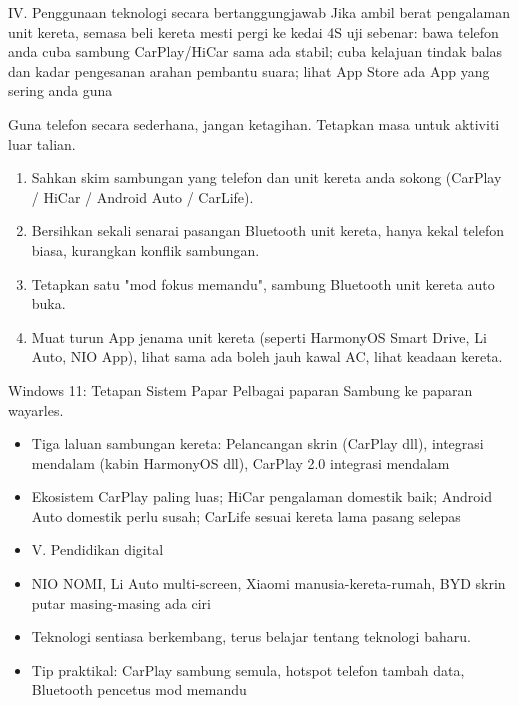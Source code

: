 \begin{tcbinfo}{IV. Penggunaan teknologi secara bertanggungjawab}
Jika ambil berat pengalaman unit kereta, semasa beli kereta mesti pergi ke kedai 4S uji sebenar: bawa telefon anda cuba sambung CarPlay/HiCar sama ada stabil; cuba kelajuan tindak balas dan kadar pengesanan arahan pembantu suara; lihat App Store ada App yang sering anda guna

\end{tcbinfo}

\begin{tcbpractice}{Guna telefon secara sederhana, jangan ketagihan. Tetapkan masa untuk aktiviti luar talian.}
\begin{enumerate}
  \item Sahkan skim sambungan yang telefon dan unit kereta anda sokong (CarPlay / HiCar / Android Auto / CarLife).
  \item Bersihkan sekali senarai pasangan Bluetooth unit kereta, hanya kekal telefon biasa, kurangkan konflik sambungan.
  \item Tetapkan satu "mod fokus memandu", sambung Bluetooth unit kereta auto buka.
  \item Muat turun App jenama unit kereta (seperti HarmonyOS Smart Drive, Li Auto, NIO App), lihat sama ada boleh jauh kawal AC, lihat keadaan kereta.
\end{enumerate}

\end{tcbpractice}

\begin{tcbsummary}{Windows 11: Tetapan Sistem Papar Pelbagai paparan Sambung ke paparan wayarles.}
\begin{itemize}
  \item Tiga laluan sambungan kereta: Pelancangan skrin (CarPlay dll), integrasi mendalam (kabin HarmonyOS dll), CarPlay 2.0 integrasi mendalam
  \item Ekosistem CarPlay paling luas; HiCar pengalaman domestik baik; Android Auto domestik perlu susah; CarLife sesuai kereta lama pasang selepas
  \item V. Pendidikan digital
  \item NIO NOMI, Li Auto multi-screen, Xiaomi manusia-kereta-rumah, BYD skrin putar masing-masing ada ciri
  \item Teknologi sentiasa berkembang, terus belajar tentang teknologi baharu.
  \item Tip praktikal: CarPlay sambung semula, hotspot telefon tambah data, Bluetooth pencetus mod memandu
\end{itemize}

\end{tcbsummary}
